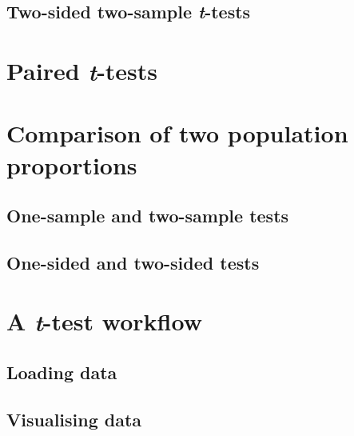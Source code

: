 \documentclass[english,10pt,a4paper,oneside]{book}
\begin{document}
\hypertarget{two-sided-two-sample-t-tests}{%
\subsection{\texorpdfstring{Two-sided two-sample \emph{t}-tests}{Two-sided two-sample t-tests}}\label{two-sided-two-sample-t-tests}}

\hypertarget{paired-t-tests}{%
\section{\texorpdfstring{Paired \emph{t}-tests}{Paired t-tests}}\label{paired-t-tests}}

\hypertarget{comparison-of-two-population-proportions}{%
\section{Comparison of two population proportions}\label{comparison-of-two-population-proportions}}

\hypertarget{one-sample-and-two-sample-tests}{%
\subsection{One-sample and two-sample tests}\label{one-sample-and-two-sample-tests}}

\hypertarget{one-sided-and-two-sided-tests}{%
\subsection{One-sided and two-sided tests}\label{one-sided-and-two-sided-tests}}

\hypertarget{a-t-test-workflow}{%
\section{\texorpdfstring{A \emph{t}-test workflow}{A t-test workflow}}\label{a-t-test-workflow}}

\hypertarget{loading-data}{%
\subsection{Loading data}\label{loading-data}}

\hypertarget{visualising-data}{%
\subsection{Visualising data}\label{visualising-data}}
\end{document}
